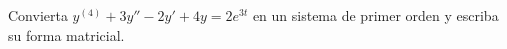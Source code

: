 Convierta $y^{(4)}+3y''-2y'+4y=2e^{3t}$ en un sistema de primer orden y escriba su forma matricial.
